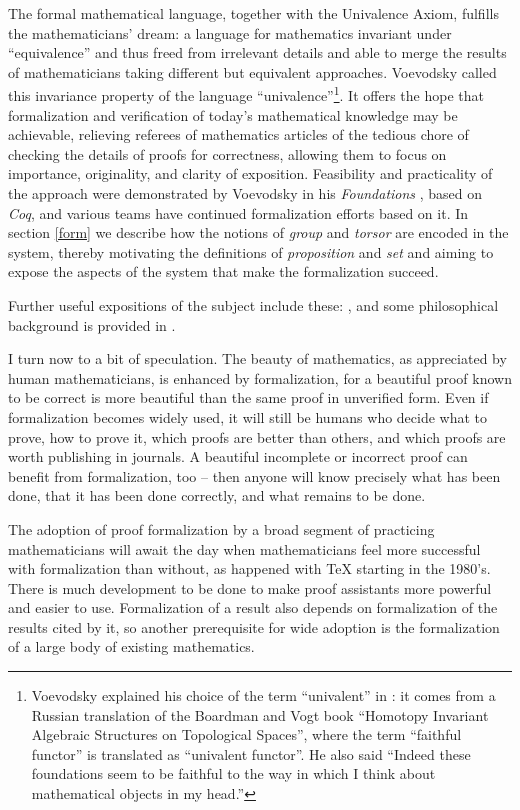 \documentclass[letter,12pt]{amsart}
\theoremstyle{definition}
\theoremstyle{remark}
\numberwithin{equation}{section}
\begin{document}
The formal mathematical language, together with the Univalence Axiom, fulfills the mathematicians' dream: a language for mathematics invariant under
``equivalence'' and thus freed from irrelevant details and able to merge the results of mathematicians taking different but equivalent
approaches.  Voevodsky called this invariance property of the language ``univalence''\footnote{Voevodsky explained his choice of the term
  ``univalent'' in \citep{VV-IHP-talk}: it comes from a Russian translation of the Boardman and Vogt book ``Homotopy Invariant Algebraic
  Structures on Topological Spaces'', where the term ``faithful functor'' is translated as ``univalent functor''.  He also said ``Indeed these
  foundations seem to be faithful to the way in which I think about mathematical objects in my head.''}.
It offers the hope that formalization and verification
of today's mathematical knowledge may be achievable, relieving referees of mathematics articles of the tedious chore of checking the details of
proofs for correctness, allowing them to focus on importance, originality, and clarity of exposition.  Feasibility and practicality of the
approach were demonstrated by Voevodsky in his {\em Foundations} \citep{Foundations,UniMath2015}, based on {\em Coq}, and various teams have continued
formalization efforts based on it.  In section \ref{form} we describe how the notions of {\em group} and {\em torsor} are encoded in the system,
thereby motivating the definitions of {\em proposition} and {\em set} and aiming to expose the aspects of the system that make the formalization
succeed.

Further useful expositions of the subject include these: \citep{MR3363596,hottbook,Swansea-Shulman}, and some philosophical background is provided in
\citep{Tsem1,Tsem2,Tsem3,Tsem4}.

I turn now to a bit of speculation.  The beauty of mathematics, as appreciated by human mathematicians, is enhanced by formalization, for a
beautiful proof known to be correct is more beautiful than the same proof in unverified form.  Even if formalization becomes widely used, it
will still be humans who decide what to prove, how to prove it, which proofs are better than others, and which proofs are worth publishing in
journals.  A beautiful incomplete or incorrect proof can benefit from formalization, too -- then anyone will know precisely what has been done,
that it has been done correctly, and what remains to be done.

The adoption of proof formalization by a broad segment of practicing mathematicians will await the day when mathematicians feel more successful
with formalization than without, as happened with {\TeX} starting in the 1980's.  There is much development to be done to make proof
assistants more powerful and easier to use.  Formalization of a result also depends on formalization of the results cited by it, so another
prerequisite for wide adoption is the formalization of a large body of existing mathematics.
\end{document}
